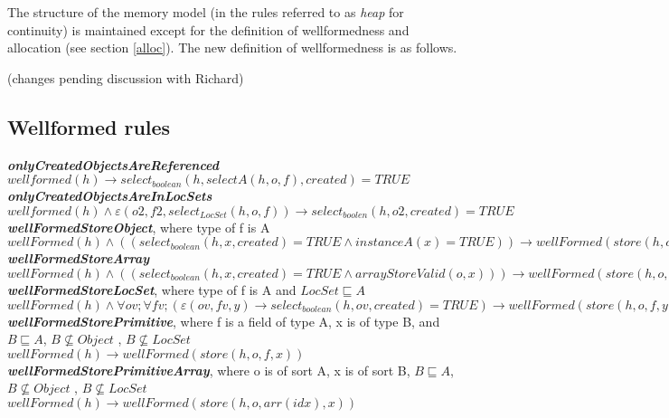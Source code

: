 \documentclass{article}
\begin{document}
	The structure of the memory model (in the rules referred to as \textit{heap} for continuity) is maintained except for the definition of wellformedness and allocation (see section \ref{alloc}). The new definition of wellformedness is as follows. 
	
	(changes pending discussion with Richard)
	
	\subsection{Wellformed rules} \label{wellformedrules}
	\textit{\textbf{onlyCreatedObjectsAreReferenced}} \\
	$wellformed(h) \to select_{boolean} (h,selectA (h,o,f), created) = TRUE$ \\
	
	\textit{\textbf{onlyCreatedObjectsAreInLocSets}} \\
	$wellformed(h) \land \varepsilon (o2, f2,select_{LocSet}(h,o, f)) \to  select_{boolen}(h,o2, created) = TRUE $\\
	
	\textit{\textbf{wellFormedStoreObject}}, where type of f is A \\
	$wellFormed(h) \land ((select_{boolean}(h, x, created) = TRUE \land instanceA(x) = TRUE)) \to wellFormed(store(h,o, f, x))$\\
	
	\textit{\textbf{wellFormedStoreArray}} \\
	$wellFormed(h) \land ( (select_{boolean}(h, x, created) = TRUE \land arrayStoreValid(o, x)))
	\to wellFormed(store(h,o,arr(idx), x)))$\\
	
	\textit{\textbf{wellFormedStoreLocSet}}, where type of f is A and $LocSet \sqsubseteq A$ \\
	$wellFormed(h)\land \forall ov;\forall f v;(\varepsilon (ov, f v, y) \to select_{boolean}(h,ov, created) = TRUE) \to wellFormed(store(h,o, f, y)) $\\
	
	\textit{\textbf{wellFormedStorePrimitive}}, where f is a field of type A, x is of type B, and $B \sqsubseteq A$, $B 
	\nsubseteq Object$ , $B \nsubseteq LocSet$\\
	$wellFormed(h) \to wellFormed(store(h,o, f, x))$\\
	
	\textit{\textbf{wellFormedStorePrimitiveArray}},  where o is of sort A, x is of sort B, $B \sqsubseteq A$, $B \nsubseteq Object$ , $B \nsubseteq LocSet$ \\
	$wellFormed(h) \to wellFormed(store(h,o,arr(idx), x))$\\
	
\end{document}
